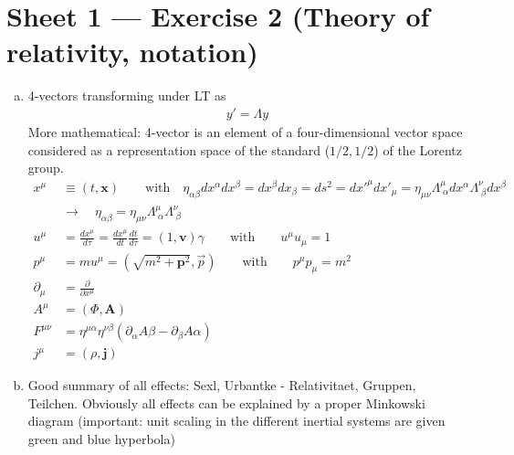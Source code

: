 \documentclass[10pt,a4paper]{report}
\theoremstyle{definition}
\begin{document}
\section{Sheet 1 — Exercise 2 (Theory of relativity, notation)}
\begin{enumerate}[a)]
\item 4-vectors transforming under LT as
\begin{align}
y'=\Lambda y
\end{align}
More mathematical: 4-vector is an element of a four-dimensional vector space considered as a representation space of the standard ($1/2,1/2$) of the Lorentz group. 
\begin{align}
x^\mu&\equiv(t,\mathbf{x})\qquad\text{with}\quad \eta_{\alpha\beta}dx^\alpha dx^\beta=dx^\beta dx_\beta=ds^2=dx'^\mu dx'_\mu=\eta_{\mu\nu}\Lambda^\mu_{\;\alpha}dx^\alpha \Lambda^\nu_{\;\beta}dx^\beta\\
&\rightarrow\quad\eta_{\alpha\beta}=\eta_{\mu\nu}\Lambda^\mu_{\;\alpha} \Lambda^\nu_{\;\beta}\\
u^\mu&=\frac{dx^\mu}{d\tau}=\frac{dx^\mu}{dt}\frac{dt}{d\tau}=(1,\mathbf{v})\gamma\qquad\text{with}\qquad u^\mu u_\mu=1\\
p^\mu&=mu^\mu=(\sqrt{m^2+\mathbf{p}^2},\vec{p})\qquad\text{with}\qquad p^\mu p_\mu=m^2\\
\partial_\mu&=\frac{\partial}{\partial x^\mu}\\
A^\mu&=(\Phi,\mathbf{A})\\
F^{\mu\nu}&=\eta^{\mu\alpha}\eta^{\nu\beta}(\partial_\alpha A\beta-\partial_\beta A\alpha)\\
j^\mu&=(\rho,\mathbf{j})
\end{align}

\item Good summary of all effects: {\sc Sexl, Urbantke} - Relativitaet, Gruppen, Teilchen. Obviously all effects can be explained by a proper Minkowski diagram (important: unit scaling in the different inertial systems are given green and blue hyperbola) \\
\begin{center}
\end{center}
\end{enumerate}
\end{document}
